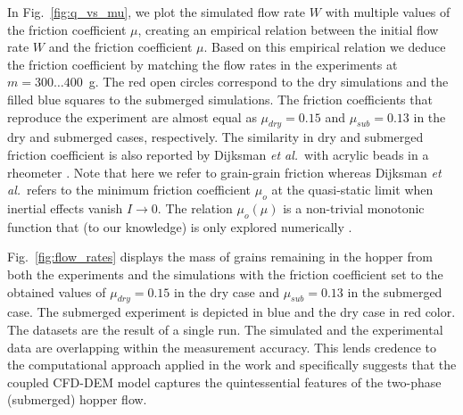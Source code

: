 \documentclass[twoside,twocolumn,9pt]{article}
\begin{document}
%
{In Fig.~\ref{fig:q_vs_mu}, we plot the simulated flow rate $W$ with multiple values of the friction coefficient $\mu$, creating an empirical relation between the initial flow rate $W$ and the friction coefficient $\mu$. Based on this empirical relation we deduce the friction coefficient by matching the flow rates in the experiments at $m=300\ldots 400$~g. The red open circles correspond to the dry simulations  and the filled blue squares to the submerged simulations. The friction coefficients that reproduce the experiment are almost equal as $\mu_{dry}=0.15$ and $\mu_{sub}=0.13$ in the dry and submerged cases, respectively. The similarity in dry and submerged friction coefficient is also reported by Dijksman {\it et al.}~with acrylic beads in a rheometer \cite{DijksmanPRE10}. Note that here we refer to grain-grain friction whereas Dijksman {\it et al.}~refers to the  minimum friction coefficient $\mu_o$ at the quasi-static limit when inertial effects vanish $I\to 0$. The relation $\mu_o(\mu)$ is a non-trivial monotonic function that (to our knowledge) is only explored numerically \cite{Lemaitre09RHA,DaCruz05PRE,Trulsson16PRE}.} %

{Fig.~\ref{fig:flow_rates} displays the mass of grains remaining in the hopper from both the experiments and the simulations with the friction coefficient set to the obtained values of $\mu_{dry}=0.15$ in the dry case and $\mu_{sub}=0.13$ in the submerged case. The submerged experiment is depicted in blue and the dry case in red color. The datasets are the result of a single run. The simulated and the experimental data are overlapping within the measurement accuracy. This lends credence to the computational approach applied in the work and specifically suggests that the coupled CFD-DEM model captures the quintessential features of the two-phase (submerged) hopper flow.}
\end{document}
